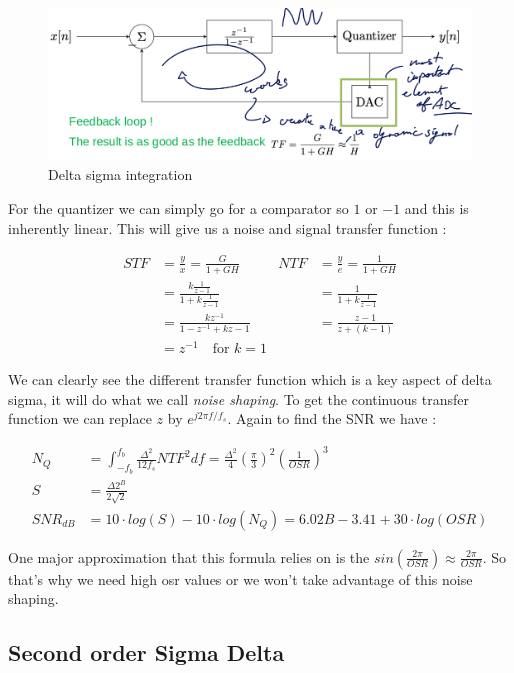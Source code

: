 \documentclass{report}
\begin{document}
\begin{figure}[H]
    \centering
    \includegraphics[width=0.75\linewidth]{delta_sigma.png}
    \caption{Delta sigma integration}
    \label{fig:delta-sigma-label}
\end{figure}

For the quantizer we can simply go for a comparator so $1$ or $-1$ and this is inherently linear. This will give us a noise and signal transfer function : 

\begin{align}
STF &= \frac{y}{x} = \frac{G}{1 + GH} & NTF &=  \frac{y}{e} = \frac{1}{1 + GH} \\ 
&= \frac{k \frac{1}{z-1}}{1 + k \frac{1}{z-1}} & &= \frac{1}{1 + k \frac{1}{z-1}}\\ 
&= \frac{k z^{-1}}{1 - z^{-1} + k z-1} & &= \frac{z-1}{z+(k-1)} \\ 
&= z^{-1} \quad \text{for } k = 1
\end{align}

We can clearly see the different transfer function which is a key aspect of delta sigma, it will do what we call \textit{noise shaping}. To get the continuous transfer function we can replace $z$ by $e^{j 2 \pi f/f_s}$. Again to find the SNR we have :

\begin{align}
    N_Q &= \int_{-f_b}^{f_b} \frac{\Delta^2}{12 f_s} NTF^2 df = \frac{\Delta^2}{4} \left(\frac{\pi}{3} \right)^2 \left( \frac{1}{OSR} \right)^3\\
    S &= \frac{\Delta 2^B}{2\sqrt{2}}\\
    SNR_{dB} &= 10 \cdot log(S) - 10 \cdot log(N_Q) = 6.02B-3.41+30\cdot log(OSR)  \label{eq:snr-noise}
\end{align}

One major approximation that this formula relies on is the $sin\left(\frac{2\pi}{OSR}\right) \approx \frac{2\pi}{OSR}$. So that's why we need high \gls{osr} values or we won't take advantage of this noise shaping.

\subsection{Second order Sigma Delta}
\end{document}
